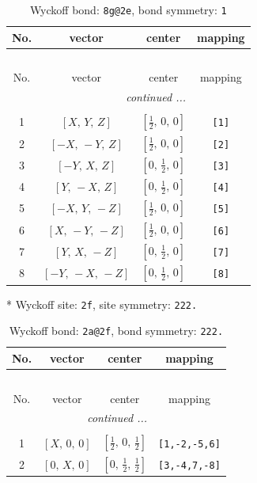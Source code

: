 \documentclass[fleqn,8pt]{jsarticle}
\begin{document}
\renewcommand{\arraystretch}{1.2}
\begin{longtable}{cccc}
\caption{Wyckoff bond: {\tt 8g@2e}, bond symmetry: {\tt 1}}
 \\
 \hline \hline
No. & vector & center & mapping \\ \hline \endfirsthead

\multicolumn{3}{l}{\tablename\ \thetable{}} \\
 \hline \hline
No. & vector & center & mapping \\ \hline \endhead

 \hline \hline
\multicolumn{3}{r}{\footnotesize\it continued ...} \\ \endfoot

 \hline \hline
\multicolumn{3}{r}{} \\ \endlastfoot

1 & $\left[ X,\, Y,\, Z \right]$ & $\left[ \frac{1}{2},\, 0,\, 0 \right]$ & {\tt [1]} \\ \hline
2 & $\left[ - X,\, - Y,\, Z \right]$ & $\left[ \frac{1}{2},\, 0,\, 0 \right]$ & {\tt [2]} \\ \hline
3 & $\left[ - Y,\, X,\, Z \right]$ & $\left[ 0,\, \frac{1}{2},\, 0 \right]$ & {\tt [3]} \\ \hline
4 & $\left[ Y,\, - X,\, Z \right]$ & $\left[ 0,\, \frac{1}{2},\, 0 \right]$ & {\tt [4]} \\ \hline
5 & $\left[ - X,\, Y,\, - Z \right]$ & $\left[ \frac{1}{2},\, 0,\, 0 \right]$ & {\tt [5]} \\ \hline
6 & $\left[ X,\, - Y,\, - Z \right]$ & $\left[ \frac{1}{2},\, 0,\, 0 \right]$ & {\tt [6]} \\ \hline
7 & $\left[ Y,\, X,\, - Z \right]$ & $\left[ 0,\, \frac{1}{2},\, 0 \right]$ & {\tt [7]} \\ \hline
8 & $\left[ - Y,\, - X,\, - Z \right]$ & $\left[ 0,\, \frac{1}{2},\, 0 \right]$ & {\tt [8]} \\
\end{longtable}
* Wyckoff site: {\tt 2f}, site symmetry: {\tt 222.}
\renewcommand{\arraystretch}{1.2}
\begin{longtable}{cccc}
\caption{Wyckoff bond: {\tt 2a@2f}, bond symmetry: {\tt 222.}}
 \\
 \hline \hline
No. & vector & center & mapping \\ \hline \endfirsthead

\multicolumn{3}{l}{\tablename\ \thetable{}} \\
 \hline \hline
No. & vector & center & mapping \\ \hline \endhead

 \hline \hline
\multicolumn{3}{r}{\footnotesize\it continued ...} \\ \endfoot

 \hline \hline
\multicolumn{3}{r}{} \\ \endlastfoot

1 & $\left[ X,\, 0,\, 0 \right]$ & $\left[ \frac{1}{2},\, 0,\, \frac{1}{2} \right]$ & {\tt [1,-2,-5,6]} \\ \hline
2 & $\left[ 0,\, X,\, 0 \right]$ & $\left[ 0,\, \frac{1}{2},\, \frac{1}{2} \right]$ & {\tt [3,-4,7,-8]} \\
\end{longtable}
\end{document}
